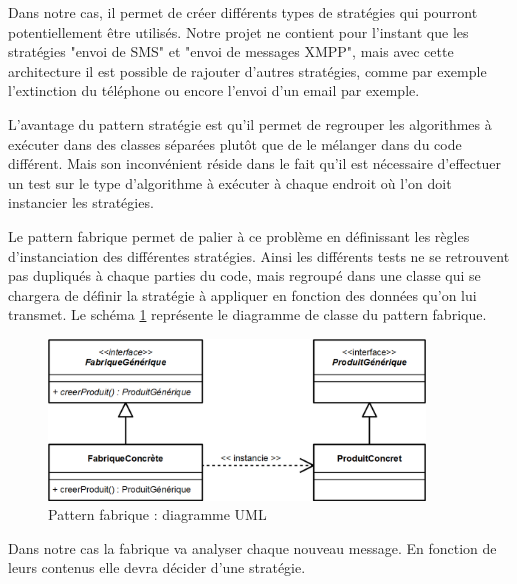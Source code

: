 Dans notre cas, il permet de créer différents types de stratégies qui pourront potentiellement être utilisés.
Notre projet ne contient pour l'instant que les stratégies "envoi de SMS" et "envoi de messages XMPP", mais avec cette architecture il est possible de rajouter d'autres stratégies, comme par exemple l'extinction du téléphone ou encore l'envoi d'un email par exemple.
\\



L'avantage du pattern stratégie est qu'il permet de regrouper les algorithmes à exécuter dans des classes séparées plutôt que de le mélanger dans du code différent.
Mais son inconvénient réside dans le fait qu'il est nécessaire d'effectuer un test sur le type d'algorithme à exécuter à chaque endroit où l'on doit instancier les stratégies.

Le pattern fabrique permet de palier à ce problème en définissant les règles d'instanciation des différentes stratégies.
Ainsi les différents tests ne se retrouvent pas dupliqués à chaque parties du code, mais regroupé dans une classe qui se chargera de définir la stratégie à appliquer en fonction des données qu'on lui transmet.
Le schéma \ref{pattern_fabrique} représente le diagramme de classe du pattern fabrique.
 
\begin{figure}[H]
  \center
  \includegraphics[width=10cm]{img/pattern_fabrique.png}
  \caption{Pattern fabrique : diagramme UML}
  \label{pattern_fabrique}
\end{figure}
 
Dans notre cas la fabrique va analyser chaque nouveau message.
En fonction de leurs contenus elle devra décider d'une stratégie.
\\



